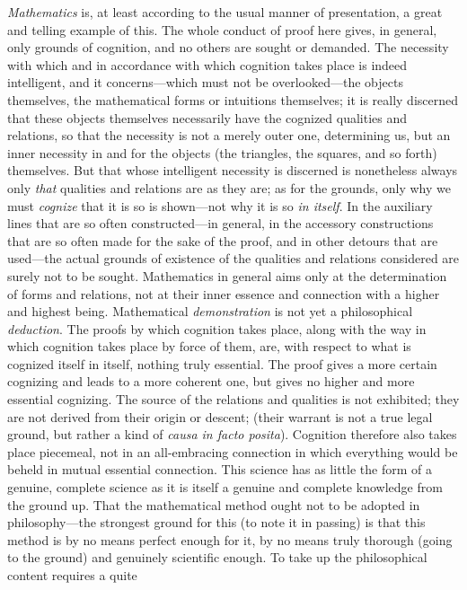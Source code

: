 \documentclass[12pt,a4paper]{book}
\begin{document}
\emph{Mathematics} is, at least according to the usual manner of presentation, a
great and telling example of this. The whole conduct of proof here gives, in
general, only grounds of cognition, and no others are sought or demanded. The
necessity with which and in accordance with which cognition takes place is indeed
intelligent, and it concerns---which must not be overlooked---the objects
themselves, the mathematical forms or intuitions themselves; it is really
discerned that these objects themselves necessarily have the cognized qualities
and relations, so that the necessity is not a merely outer one, determining us,
but an inner necessity in and for the objects (the triangles, the squares, and so
forth) themselves. But that whose intelligent necessity is discerned is
nonetheless always only \emph{that} qualities and relations are as they are; as for the
grounds, only why we must \emph{cognize} that it is so is shown---not why it is so
\emph{in itself}. In the auxiliary lines that are so often constructed---in
general, in the accessory constructions that are so often made for the sake of the
proof, and in other detours that are used---the actual grounds of existence of the
qualities and relations considered are surely not to be sought. Mathematics in
general aims only at the determination of forms and relations, not at their inner
essence and connection with a higher and highest being. Mathematical
\emph{demonstration} is not yet a philosophical \emph{deduction}. The proofs by
which cognition takes place, along with the way in which cognition takes place by
force of them, are, with respect to what is cognized itself in itself, nothing
truly essential. The proof gives a more certain cognizing and leads to a more
coherent one, but gives no higher and more essential cognizing. The source of the
relations and qualities is not exhibited; they are not derived from their origin
or descent; (their warrant is not a true legal ground, but rather a kind of
\textit{causa in facto posita}). Cognition therefore also takes place piecemeal,
not in an all-embracing connection in which everything would be beheld in mutual
essential connection. This science has as little the form of a genuine, complete
science as it is itself a genuine and complete knowledge from the ground up. That
the mathematical method ought not to be adopted in philosophy---the strongest
ground for this (to note it in passing) is that this method is by no means perfect
enough for it, by no means truly thorough (going to the ground) and genuinely
scientific enough. To take up the philosophical content requires a quite
\end{document}
